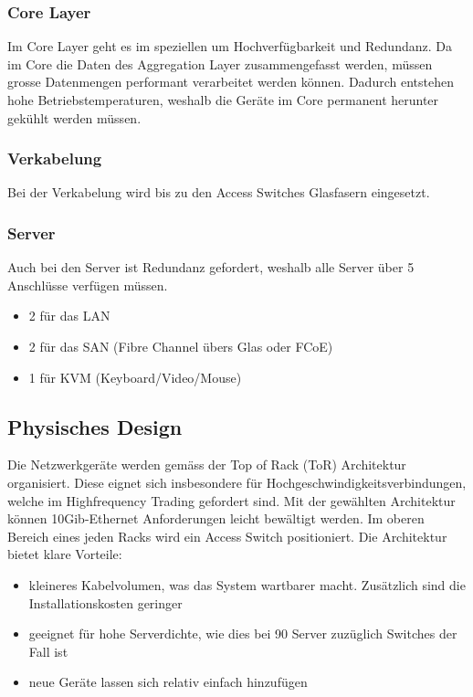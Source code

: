 \subsubsection{Core Layer}
Im Core Layer geht es im speziellen um Hochverfügbarkeit und Redundanz. Da im Core die Daten des Aggregation Layer zusammengefasst werden, müssen grosse Datenmengen performant verarbeitet werden können. Dadurch entstehen hohe Betriebstemperaturen, weshalb die Geräte im Core permanent herunter gekühlt werden müssen.

\subsubsection{Verkabelung}
Bei der Verkabelung wird bis zu den Access Switches Glasfasern eingesetzt. 

\subsubsection{Server}
Auch bei den Server ist Redundanz gefordert, weshalb alle Server über 5 Anschlüsse verfügen müssen. 
\begin{itemize}
	\item 2 für das LAN 
	\item 2 für das SAN (Fibre Channel übers Glas oder FCoE)
	\item 1 für KVM (Keyboard/Video/Mouse)
\end{itemize}

\subsection{Physisches Design}
Die Netzwerkgeräte werden gemäss der Top of Rack (ToR) Architektur organisiert. Diese eignet sich insbesondere für Hochgeschwindigkeitsverbindungen, welche im Highfrequency Trading gefordert sind. Mit der gewählten Architektur können 10Gib-Ethernet Anforderungen leicht bewältigt werden. Im oberen Bereich eines jeden Racks wird ein Access Switch positioniert. Die Architektur bietet klare Vorteile:
\begin{itemize}
	\item kleineres Kabelvolumen, was das System wartbarer macht. Zusätzlich sind die Installationskosten geringer
	\item geeignet für hohe Serverdichte, wie dies bei 90 Server zuzüglich Switches der Fall ist
	\item neue Geräte lassen sich relativ einfach hinzufügen
\end{itemize}

